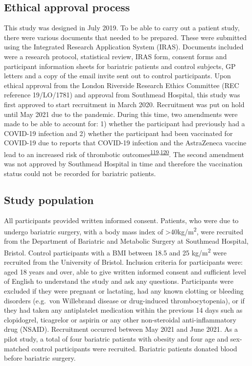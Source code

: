 \documentclass[11pt,twoside]{bristolthesis}
\begin{document}
\hypertarget{ethical-approval-process}{%
\subsection{Ethical approval process}\label{ethical-approval-process}}

This study was designed in July 2019. To be able to carry out a patient study, there were various documents that needed to be prepared. These were submitted using the Integrated Research Application System (IRAS). Documents included were a research protocol, statistical review, IRAS form, consent forms and participant information sheets for bariatric patients and control subjects, GP letters and a copy of the email invite sent out to control participants. Upon ethical approval from the London Riverside Research Ethics Committee (REC reference 19/LO/1781) and approval from Southmead Hospital, this study was first approved to start recruitment in March 2020. Recruitment was put on hold until May 2021 due to the pandemic. During this time, two amendments were made to be able to account for: 1) whether the participant had previously had a COVID-19 infection and 2) whether the participant had been vaccinated for COVID-19 due to reports that COVID-19 infection and the AstraZeneca vaccine lead to an increased risk of thrombotic outcomes\textsuperscript{\protect\hyperlink{ref-Middeldorp2020}{119},\protect\hyperlink{ref-Scully2021}{120}}. The second amendment was not approved by Southmead Hospital in time and therefore the vaccination status could not be recorded for bariatric patients.

\hypertarget{study-population-1}{%
\subsection{Study population}\label{study-population-1}}

All participants provided written informed consent. Patients, who were due to undergo bariatric surgery, with a body mass index of \textgreater40kg/m\textsuperscript{2}, were recruited from the Department of Bariatric and Metabolic Surgery at Southmead Hospital, Bristol. Control participants with a BMI between 18.5 and 25 kg/m\textsuperscript{2} were recruited from the University of Bristol. Inclusion criteria for participants were: aged 18 years and over, able to give written informed consent and sufficient level of English to understand the study and ask any questions. Participants were excluded if they were pregnant or lactating, had any known clotting or bleeding disorders (e.g.~von Willebrand disease or drug-induced thrombocytopenia), or if they had taken any antiplatelet medication within the previous 14 days such as clopidogrel, ticagrelor or aspirin or any other non-steroidal anti-inflammatory drug (NSAID). Recruitment occurred between May 2021 and June 2021. As a pilot study, a total of four bariatric patients with obesity and four age and sex-matched control participants were recruited. Bariatric patients donated blood before bariatric surgery.
\end{document}
